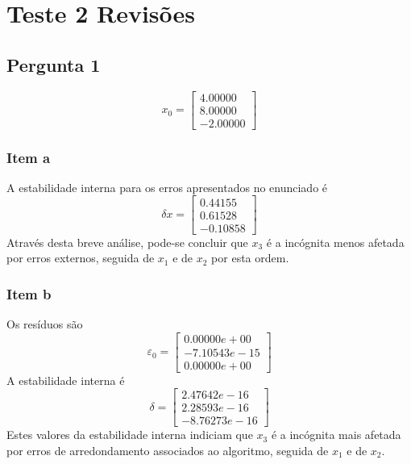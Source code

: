 \setcounter{chapter}{0}
\chapter{Teste 2 Revisões}
{
\renewcommand{\thesubsection}{\thesection\alph{subsection}}
\section{Pergunta 1}
%
\begin{equation*}
	x_0 = \begin{bmatrix}
		4.00000 \\
		8.00000 \\
		-2.00000
	\end{bmatrix}
\end{equation*}
\subsection{Item a}
A estabilidade interna para os erros apresentados no enunciado é
\begin{equation*}
	\delta x = \begin{bmatrix}
		0.44155 \\
		0.61528 \\
		-0.10858
	\end{bmatrix}
\end{equation*}
Através desta breve análise, pode-se concluir que $x_3$ é a incógnita menos afetada por erros externos, seguida de $x_1$ e de $x_2$ por esta ordem.
\subsection{Item b}
Os resíduos são
\begin{equation*}
	\varepsilon _0 = \begin{bmatrix}
		0.00000e+00 \\
		-7.10543e-15 \\
		0.00000e+00
	\end{bmatrix}
\end{equation*}
A estabilidade interna é
\begin{equation*}
	\delta = \begin{bmatrix}
		2.47642e-16 \\
		2.28593e-16 \\
		-8.76273e-16
	\end{bmatrix}
\end{equation*}
Estes valores da estabilidade interna indiciam que $x_3$ é a incógnita mais afetada por erros de arredondamento associados ao algoritmo, seguida de $x_1$ e de $x_2$.
}